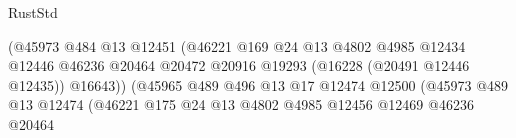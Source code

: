 \begin{lexlean}{RustStd}
\begin{coremodule}
                                                        (@45973
                                                          @484
                                                          @13
                                                          @12451
                                                          (@46221
                                                            @169
                                                            @24
                                                            @13
                                                            @4802
                                                            @4985
                                                            @12434
                                                            @12446
                                                            @46236
                                                            @20464
                                                            @20472
                                                            @20916
                                                            @19293
                                                            (@16228 (@20491 @12446 @12435))
                                                            @16643))
                                                        (@45965
                                                          @489
                                                          @496
                                                          @13
                                                          @17
                                                          @12474
                                                          @12500
                                                          (@45973
                                                            @489
                                                            @13
                                                            @12474
                                                            (@46221
                                                              @175
                                                              @24
                                                              @13
                                                              @4802
                                                              @4985
                                                              @12456
                                                              @12469
                                                              @46236
                                                              @20464

\end{coremodule}
\end{lexlean}
